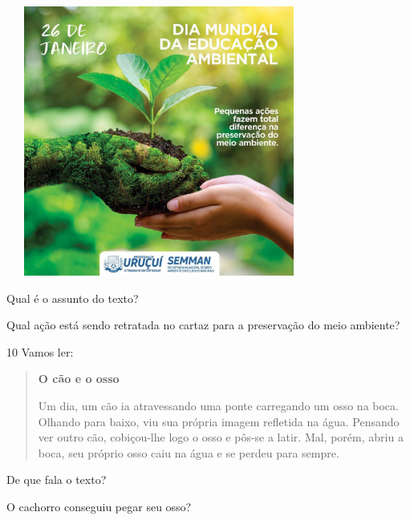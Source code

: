 \includegraphics[width=3.96154in,height=3.50028in]{media/image123.jpeg}


\begin{escolha}
\item Qual é o assunto do texto?


\item Qual ação está sendo retratada no cartaz para a preservação do meio ambiente?

\end{escolha}

\num{10} Vamos ler:

\begin{quote}
\textbf{O cão e o osso}

Um dia, um cão ia atravessando uma ponte carregando um osso na boca.
Olhando para baixo, viu sua própria imagem refletida
na água. Pensando ver outro cão, cobiçou-lhe logo o osso e
pôs-se a latir. Mal, porém, abriu a boca, seu próprio osso caiu
na água e se perdeu para sempre.
\end{quote}


\begin{escolha}
\item De que fala o texto?


\item O cachorro conseguiu pegar seu osso?

\end{escolha}

